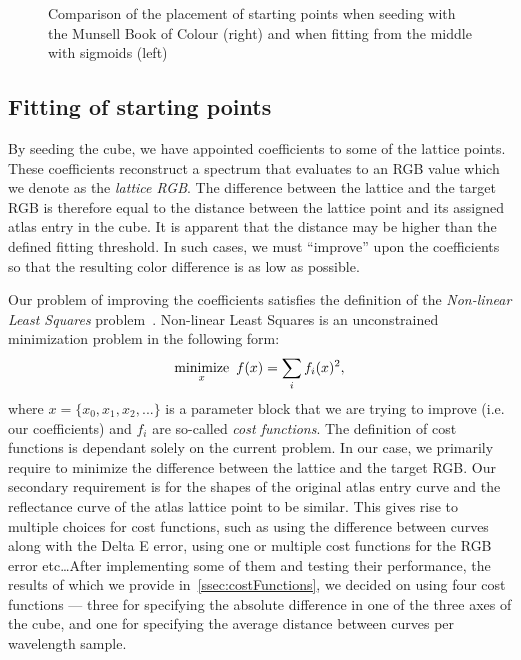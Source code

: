 \begin{figure}[t]
\begin{subfigure}[t]{0.45\textwidth}
		\label{fig:seededStarting_mcb}
	\end{subfigure}
	\caption{Comparison of the placement of starting points when seeding with the Munsell Book of Colour (right) and when fitting from the middle with sigmoids (left)}
	\label{fig:seededStartingPoints}
\end{figure}

\subsection{Fitting of starting points} \label{ssec:startingPointsFitting}

By seeding the cube, we have appointed coefficients to some of the lattice points. These coefficients reconstruct a spectrum that evaluates to an RGB value which we denote as the \emph{lattice RGB}. The difference between the lattice and the target RGB is therefore equal to the distance between the lattice point and its assigned atlas entry in the cube. It is apparent that the distance may be higher than the defined fitting threshold. In such cases, we must ``improve'' upon the coefficients so that the resulting color difference is as low as possible.

Our problem of improving the coefficients satisfies the definition of the \emph{Non-linear Least Squares} problem~\cite{nonLinearLeastSquares}. Non-linear Least Squares is an unconstrained minimization problem in the following form:
\begin{equation} \label{eq:nonLinearLeastSquares}
	 \underset{x}{\text{minimize}} \hspace{0.5em} f(x) = \sum_{i} f_{i}(x)^{2},
\end{equation}
where $x= \{x_{0}, x_{1}, x_{2}, ... \}$ is a parameter block that we are trying to improve (i.e. our coefficients) and $f_{i}$ are so-called \emph{cost functions}. The definition of cost functions is dependant solely on the current problem. In our case, we primarily require to minimize the difference between the lattice and the target RGB. Our secondary requirement is for the shapes of the original atlas entry curve and the reflectance curve of the atlas lattice point to be similar. This gives rise to multiple choices for cost functions, such as using the difference between curves along with the Delta E error, using one or multiple cost functions for the RGB error etc\ldots After implementing some of them and testing their performance, the results of which we provide in~\cref{ssec:costFunctions}, we decided on using four cost functions --- three for specifying the absolute difference in one of the three axes of the cube, and one for specifying the average distance between curves per wavelength sample.

